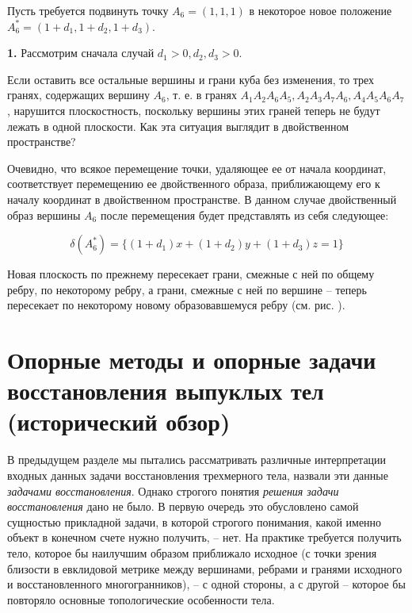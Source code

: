 \documentclass[a4paper, 12pt, titlepage]{article}
\theoremstyle{definition}
\theoremstyle{plain}
\theoremstyle{plain}
\begin{document}

Пусть требуется подвинуть точку $A_{6} = (1, 1, 1)$ в некоторое новое положение
$A_{6}^{*} = (1 + d_{1}, 1 + d_{2}, 1 + d_{3})$.

\textbf{1. } Рассмотрим сначала случай $d_{1} > 0, d_{2}, d_{3} > 0$.

Если оставить все остальные вершины и грани куба без изменения, то трех гранях,
содержащих вершину $A_{6}$, т. е. в гранях
$A_{1} A_{2} A_{6} A_{5}, A_{2} A_{3} A_{7} A_{6}, A_{4} A_{5} A_{6} A_{7}$,
нарушится плоскостность, поскольку вершины этих граней теперь не будут лежать в
одной плоскости. Как эта ситуация выглядит в двойственном пространстве?

Очевидно, что всякое перемещение точки, удаляющее ее от начала координат,
соответствует перемещению ее двойственного образа, приближающему его к началу
координат в двойственном пространстве. В данном случае двойственный образ
вершины $A_{6}$ после перемещения будет представлять из себя следующее:

\begin{equation*}
 \delta(A_{6}^{*}) = \{ (1 + d_{1}) x + (1 + d_{2}) y + (1 + d_{3}) z = 1 \}
\end{equation*}

Новая плоскость по прежнему пересекает грани, смежные с ней по общему ребру, по
некоторому ребру, а грани, смежные с ней по вершине -- теперь пересекает по
некоторому новому образовавшемуся ребру (см. рис. ).


\newpage
\section{Опорные методы и опорные задачи восстановления выпуклых
тел (исторический обзор)}

В предыдущем разделе мы пытались рассматривать различные интерпретации входных
данных задачи восстановления трехмерного тела, назвали эти данные
\textit{задачами восстановления}. Однако строгого понятия \textit{решения
задачи восстановления} дано не было. В первую очередь это обусловлено самой
сущностью прикладной задачи, в которой строгого понимания, какой именно объект
в конечном счете нужно получить, -- нет. На практике требуется получить
тело, которое бы наилучшим образом приближало исходное (с точки зрения
близости в евклидовой метрике между вершинами, ребрами и гранями исходного и
восстановленного многогранников), -- с одной стороны, а с другой -- которое бы
повторяло основные топологические особенности тела.
\end{document}

